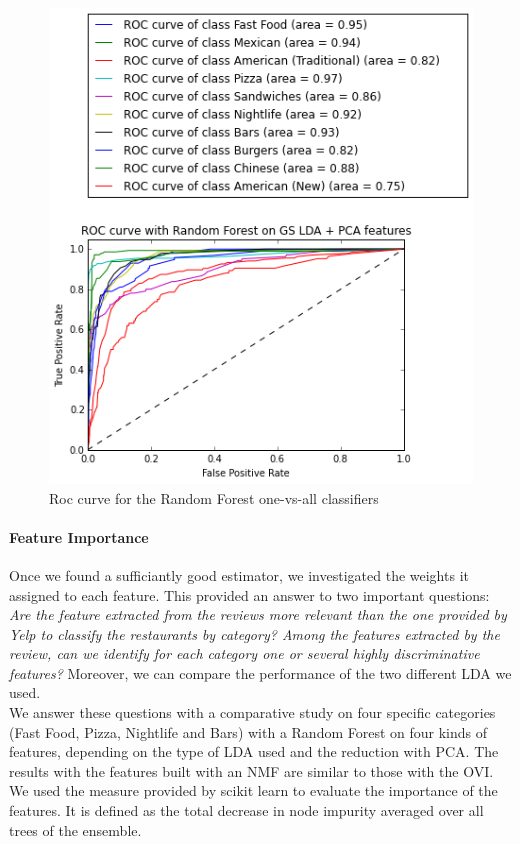 \documentclass[twoside]{article}
\begin{document}
\begin{multicols}{2}
\begin{figure}[H]
	\includegraphics[scale=0.55]{img/roc_rf.png}
	\centering
	\caption{Roc curve for the Random Forest one-vs-all classifiers}
\end{figure}


\paragraph{Feature Importance}

\noindent Once we found a sufficiantly good estimator, we investigated the weights it assigned to each feature. This provided an answer to two important questions: \textit{Are the feature extracted from the reviews more relevant than the one provided by Yelp to classify the restaurants by category? Among the features extracted by the review, can we identify for each category one or several highly discriminative features?} Moreover, we can compare the performance of the two different LDA we used.\\

\noindent We answer these questions with a comparative study on four specific categories (Fast Food, Pizza, Nightlife and Bars) with a Random Forest on four kinds of features, depending on the type of LDA used and the reduction with PCA. The results with the features built with an NMF are similar to those with the OVI. We used the measure provided by scikit learn to evaluate the importance of the features. It is defined as the total decrease in node impurity averaged over all trees of the ensemble.


\end{multicols}
\end{document}

